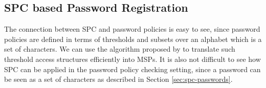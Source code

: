 \subsection{SPC based Password Registration}\label{sec:protocol}

The connection between \acl{SPC} and password policies is easy to see, since password policies are defined in terms of thresholds and subsets over an alphabet which is a set of characters.
We can use the algorithm proposed by \citet{LiuC10} to translate such threshold access structures efficiently into \acp{MSP}. 
It is also not difficult to see how \ac{SPC} can be applied in the password policy checking setting, since a password can be seen as a set of characters as described in Section \ref{sec:spc-passwords}. 


